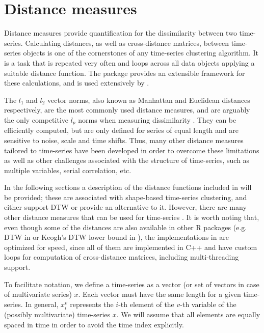 \section{Distance measures}
\label{sec:distances}

Distance measures provide quantification for the dissimilarity between two time-series.
Calculating distances,
as well as cross-distance matrices,
between time-series objects is one of the cornerstones of any time-series clustering algorithm.
It is a task that is repeated very often and loops across all data objects applying a suitable distance function.
The  package \citep{proxy} provides an extensible framework for these calculations,
and is used extensively by \dtwclust{}.

The $l_1$ and $l_2$ vector norms,
also known as Manhattan and Euclidean distances respectively,
are the most commonly used distance measures,
and are arguably the only competitive $l_p$ norms when measuring dissimilarity \citep{aggarwal2001, lemire2009}.
They can be efficiently computed,
but are only defined for series of equal length and are sensitive to noise,
scale and time shifts.
Thus, many other distance measures tailored to time-series have been developed in order to overcome these limitations as well as other challenges associated with the structure of time-series,
such as multiple variables,
serial correlation, etc.

In the following sections a description of the distance functions included in \dtwclust{} will be provided;
these are associated with shape-based time-series clustering,
and either support DTW or provide an alternative to it.
However, there are many other distance measures that can be used for time-series \citep{montero2014, tsdist}.
It is worth noting that,
even though some of the distances are also available in other R packages
(e.g. DTW in  or Keogh's DTW lower bound in ),
the implementations in \dtwclust{} are optimized for speed,
since all of them are implemented in C++ and have custom loops for computation of cross-distance matrices,
including multi-threading support.

To facilitate notation,
we define a time-series as a vector (or set of vectors in case of multivariate series) $x$.
Each vector must have the same length for a given time-series.
In general, $x^v_i$ represents the $i$-th element of the $v$-th variable of the (possibly multivariate) time-series $x$.
We will assume that all elements are equally spaced in time in order to avoid the time index explicitly.

